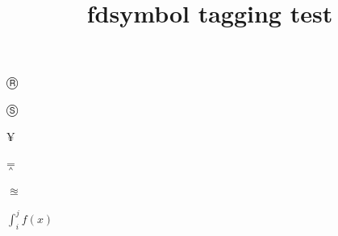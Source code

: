 \documentclass{article}
\title{fdsymbol tagging test}
\def\circledR{Ⓡ}
\def\circledS{Ⓢ}
\def\yen{¥}
\begin{document}
\circledR

\circledS

\yen

\dagger

\ddagger

\mathparagraph

\mathsection

\mathdollar

\mathsterling

$\doublebarwedge$

$\approxeq$

$\int_i^j f(x)$
\end{document}
